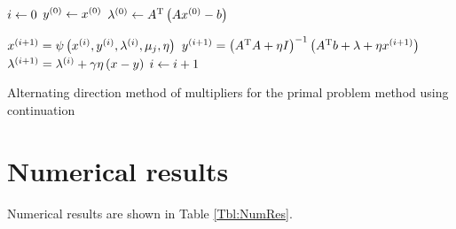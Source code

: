 \documentclass[english]{pkupaper}
\begin{document}
\begin{thmquestion}[3 (i)]
\begin{algorithm}
\SetAlgoLined


$ i \leftarrow 0 $\;
$ y^{\left( 0 \right)} \leftarrow x^{\left( 0 \right)} $\;
$ \lambda^{\left( 0 \right)} \leftarrow A^{\mathrm{T}} \left(  A x^{\left( 0 \right)} - b  \right) $\;

{
	{
		$ x^{\left(  i + 1  \right)} = \psi \left(  x^{\left( i \right)}, y^{\left( i \right)}, \lambda^{\left( i \right)}, \mu_j, \eta  \right) $\;
		$ y^{\left(  i + 1  \right)} = \left(  A^{\mathrm{T}} A + \eta I  \right)^{-1} \left(  A^{\mathrm{T}} b + \lambda + \eta x^{\left(  i + 1  \right)}  \right) $\;
		$ \lambda^{\left(  i + 1  \right)} = \lambda^{\left( i \right)} + \gamma \eta \left(  x - y  \right) $\;
		$ i \leftarrow i + 1 $\;
	}
}

\caption{Alternating direction method of multipliers for the primal problem method using continuation} \label{Alg:ADMMDirect}
\end{algorithm}

\end{thmquestion}

\section{Numerical results} \label{Sec:NumRes}

Numerical results are shown in Table \ref{Tbl:NumRes}.
\end{document}
